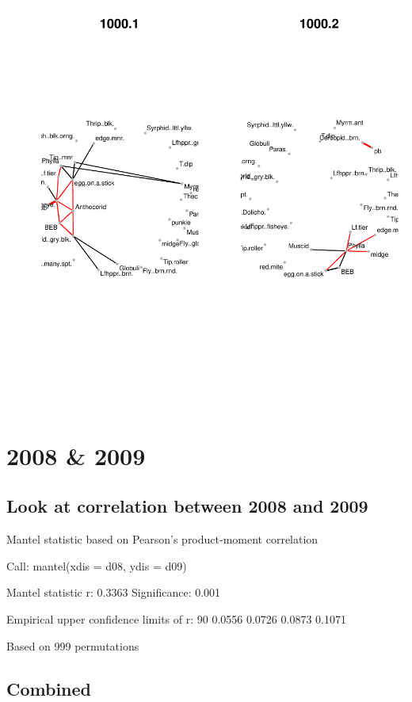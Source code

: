 \documentclass[12pt]{article}
\begin{document}
\includegraphics{pb_removal-021}


\section{2008 & 2009}

\subsection{Look at correlation between 2008 and 2009}

\begin{Schunk}
\begin{Soutput}
Mantel statistic based on Pearson's product-moment correlation 

Call:
mantel(xdis = d08, ydis = d09) 

Mantel statistic r: 0.3363 
      Significance: 0.001 

Empirical upper confidence limits of r:
   90%
0.0556 0.0726 0.0873 0.1071 

Based on 999 permutations
\end{Soutput}
\end{Schunk}

\subsection{Combined}
\end{document}
